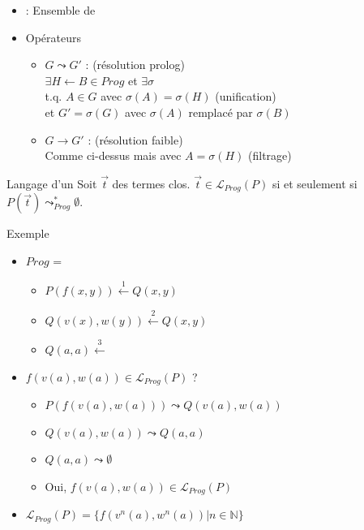 \begin{frame}{\csprogramme}
  \begin{itemize}[<+->]
  \item \csprogramme : Ensemble de \csclauses
  \item Opérateurs
    \begin{itemize}
    \item $G \leadsto G'$ : (résolution prolog) \\
      $\exists H \leftarrow B \in Prog$ et $\exists \sigma$ \\
      t.q. $A \in G$ avec $\sigma(A) = \sigma(H)$ (unification)\\
      et $G' = \sigma(G)$ avec $\sigma(A)$ remplacé par $\sigma(B)$
    \item $G \rightarrow G'$ : (résolution faible) \\
      Comme ci-dessus mais avec $A = \sigma(H)$ (filtrage)
    \end{itemize}
  \end{itemize}
  \begin{block}{Langage d'un \csprogramme}
    Soit $\vec{t}$ des termes clos.
    $\vec{t} \in \mathcal{L}_{Prog}(P)$ si et seulement si $P(\vec{t}) \leadsto^*_{Prog} \emptyset$.
  \end{block}
\end{frame}

\begin{frame}{Exemple}
  \begin{itemize}[<+->]
  \item $Prog$ =
    \begin{itemize}
    \item {}$P(f(x,y)) \stackrel{1}{\leftarrow} Q(x, y)$ \\
    \item {}$Q(v(x), w(y)) \stackrel{2}{\leftarrow} Q(x, y)$ \\
    \item {}$Q(a, a) \stackrel{3}{\leftarrow} $
    \end{itemize}
  \item $f(v(a),w(a)) \in \mathcal{L}_{Prog}(P)$ ?
    \begin{itemize}
    \item $P(f(v(a),w(a))) \leadsto Q(v(a), w(a))$ \\
    \item $Q(v(a), w(a)) \leadsto Q(a, a)$ \\
    \item $Q(a, a) \leadsto \emptyset$
    \item Oui, $f(v(a),w(a)) \in \mathcal{L}_{Prog}(P)$
    \end{itemize}
  \item $\mathcal{L}_{Prog}(P) = \{f(v^n(a),w^n(a)) | n \in \mathbb{N}\}$
  \end{itemize}
\end{frame}

